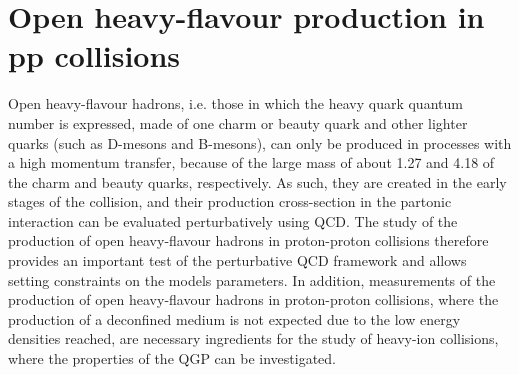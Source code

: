 \chapter{Open heavy-flavour production in pp collisions}

Open heavy-flavour hadrons, i.e. those in which the heavy quark quantum number is expressed, made of one charm or beauty quark and other lighter quarks (such as D-mesons and B-mesons), can only be produced in processes with a high momentum transfer, because of the large mass of about 1.27 \gevcc and 4.18 \gevcc of the charm and beauty quarks, respectively. As such, they are created in the early stages of the collision, and their production cross-section in the partonic interaction can be evaluated perturbatively using QCD. The study of the production of open heavy-flavour hadrons in proton-proton collisions therefore provides an important test of the perturbative QCD framework and allows setting constraints on the models parameters. In addition, measurements of the production of open heavy-flavour hadrons in proton-proton collisions, where the production of a deconfined medium is not expected due to the low energy densities reached, are necessary ingredients for the study of heavy-ion collisions, where the properties of the QGP can be investigated. 

